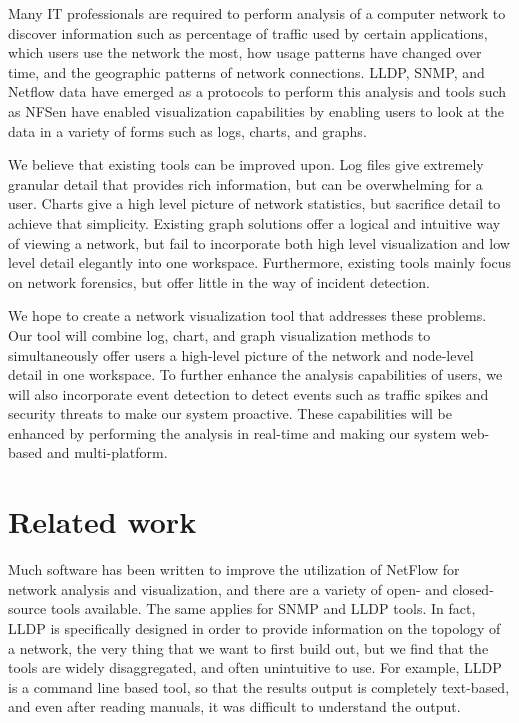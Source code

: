 \documentclass{sig-alternate}
\begin{document}
Many IT professionals are required to perform analysis of a computer network to
discover information such as percentage of traffic used by certain applications,
which users use the network the most, how usage patterns have changed over time,
and the geographic patterns of network connections. LLDP, SNMP, and Netflow data
have emerged as a protocols to perform this analysis and tools such as NFSen
have enabled visualization capabilities by enabling users to look at the data in
a variety of forms such as logs, charts, and graphs.

We believe that existing tools can be improved upon. Log files give extremely
granular detail that provides rich information, but can be overwhelming for a
user. Charts give a high level picture of network statistics, but sacrifice
detail to achieve that simplicity. Existing graph solutions offer a logical and
intuitive way of viewing a network, but fail to incorporate both high level
visualization and low level detail elegantly into one workspace. Furthermore,
existing tools mainly focus on network forensics, but offer little in the way of
incident detection.

We hope to create a network visualization tool that addresses these problems.
Our tool will combine log, chart, and graph visualization methods to
simultaneously offer users a high-level picture of the network and node-level
detail in one workspace. To further enhance the analysis capabilities of users,
we will also incorporate event detection to detect events such as traffic spikes
and security threats to make our system proactive. These capabilities will be
enhanced by performing the analysis in real-time and making our system web-based
and multi-platform.

\section{Related work}

Much software has been written to improve the utilization of NetFlow for network
analysis and visualization, and there are a variety of open- and closed-source
tools available. The same applies for SNMP and LLDP tools. In fact, LLDP is
specifically designed in order to provide information on the topology of a
network, the very thing that we want to first build out, but we find that the
tools are widely disaggregated, and often unintuitive to use. For example, LLDP
is a command line based tool, so that the results output is completely
text-based, and even after reading manuals, it was difficult to understand the
output.
\end{document}
